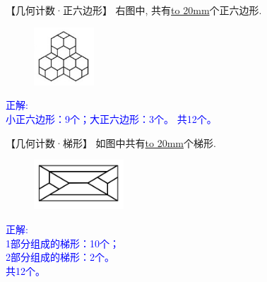 \item {
    【几何计数·正六边形】
    右图中, 共有\underline{\hbox to 20mm{}}个正六边形.
    \begin{figure}[H] 
        \centering
        \includegraphics[width=0.2\textwidth]{./pics/Chapter_4/14.png}
    \end{figure}
    \ifshowSolution 
        \fangsong{}\textcolor{blue}{
            正解: \\
            小正六边形：9个；大正六边形：3个。
            共12个。
        }
    \else
        \vspace{1cm}
    \fi
}

\item {
    【几何计数·梯形】
    如图中共有\underline{\hbox to 20mm{}}个梯形.
    \begin{figure}[H] 
        \centering
        \includegraphics[width=0.3\textwidth]{./pics/Chapter_4/2016_1.png}
    \end{figure}
    \ifshowSolution 
        \fangsong{}\textcolor{blue}{
            正解: \\
            1部分组成的梯形：10个；\\
            2部分组成的梯形：2个。\\
            共12个。
        }
    \else
        \vspace{1cm}
    \fi
}

